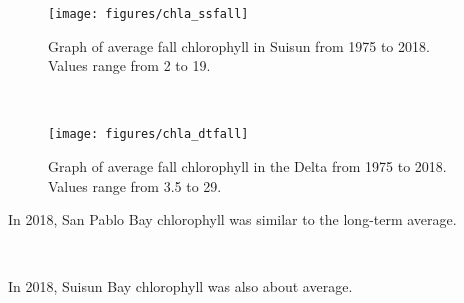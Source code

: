 \documentclass[
]{book}
\begin{document}
\begin{panel-grid}
\begin{columns-nocenter}
\begin{column800}

\begin{expand}

\begin{figure}
\texttt{[image: figures/chla\_ssfall]} \caption{Graph of average fall chlorophyll in Suisun from 1975 to 2018. Values range from 2 to 19.}\label{fig:unnamed-chunk-109}
\end{figure}

\end{expand}

\end{column800}

\begin{column40}

~

\end{column40}

\begin{column800}

\begin{expand}

\begin{figure}
\texttt{[image: figures/chla\_dtfall]} \caption{Graph of average fall chlorophyll in the Delta from 1975 to 2018. Values range from 3.5 to 29.}\label{fig:unnamed-chunk-110}
\end{figure}

\end{expand}

\end{column800}

\end{columns-nocenter}

\begin{columns-nocenter}

\begin{column800}

In 2018, San Pablo Bay chlorophyll was similar to the long-term average.

\end{column800}

\begin{column40}

~

\end{column40}

\begin{column800}

In 2018, Suisun Bay chlorophyll was also about average.


\end{column800}
\end{columns-nocenter}
\end{panel-grid}
\end{document}
